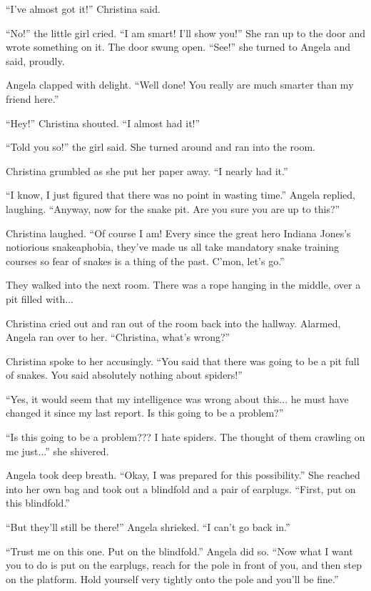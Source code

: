 \documentclass[showtrims,b6paper,draft,10pt]{memoir}
\begin{document}
``I've almost got it!'' Christina said.

``No!'' the little girl cried.  ``I am smart!  I'll show you!''  She ran up to the door and wrote something on it.  The door swung open.  ``See!''  she turned to Angela and said, proudly.

Angela clapped with delight.  ``Well done!  You really are much smarter than my friend here.''

``Hey!''  Christina shouted.  ``I almost had it!''

``Told you so!''  the girl said.  She turned around and ran into the room.

Christina grumbled as she put her paper away.  ``I nearly had it.''

``I know, I just figured that there was no point in wasting time.''  Angela replied, laughing.  ``Anyway, now for the snake pit.  Are you sure you are up to this?''

Christina laughed.  ``Of course I am!  Every since the great hero Indiana Jones's notiorious snakeaphobia, they've made us all take mandatory snake training courses so fear of snakes is a thing of the past.  C'mon, let's go.''

They walked into the next room.  There was a rope hanging in the middle, over a pit filled with...

Christina cried out and ran out of the room back into the hallway.  Alarmed, Angela ran over to her.  ``Christina, what's wrong?''

Christina spoke to her accusingly.  ``You said that there was going to be a pit full of snakes.  You said absolutely nothing about spiders!''

``Yes, it would seem that my intelligence was wrong about this... he must have changed it since my last report.  Is this going to be a problem?''

``Is this going to be a problem???  I hate spiders.  The thought of them crawling on me just...'' she shivered.

Angela took deep breath.  ``Okay, I was prepared for this possibility.''  She reached into her own bag and took out a blindfold and a pair of earplugs.  ``First, put on this blindfold.''

``But they'll still be there!'' Angela shrieked.  ``I can't go back in.''

``Trust me on this one.  Put on the blindfold.''  Angela did so.  ``Now what I want you to do is put on the earplugs, reach for the pole in front of you, and then step on the platform.  Hold yourself very tightly onto the pole and you'll be fine.''
\end{document}

